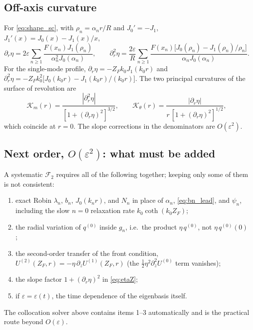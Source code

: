 \documentclass[11pt]{article}
\numberwithin{equation}{section}
\begin{document}
\subsection{Off-axis curvature}
For \eqref{eq:shape_sc}, with $\rho_n=\alpha_nr/R$ and $J_0'=-J_1$, $J_1'(x)=J_0(x)-J_1(x)/x$,
\begin{equation}\partial_r\eta=2\varepsilon\sum_{n\ge1}\frac{F(x_n)J_1(\rho_n)}{\alpha_n^2J_0(\alpha_n)},\qquad
\partial_r^2\eta=\frac{2\varepsilon}{R}\sum_{n\ge1}\frac{F(x_n)\bigl[J_0(\rho_n)-J_1(\rho_n)/\rho_n\bigr]}{\alpha_nJ_0(\alpha_n)}.\end{equation}
For the single-mode profile, $\partial_r\eta=-Z_Fk_0J_1(k_0r)$ and $\partial_r^2\eta=-Z_Fk_0^2\bigl[J_0(k_0r)-J_1(k_0r)/(k_0r)\bigr]$. The two principal curvatures of the surface of revolution are
\begin{equation}\mathcal K_m(r)=\frac{|\partial_r^2\eta|}{[1+(\partial_r\eta)^2]^{3/2}},\qquad
\mathcal K_\theta(r)=\frac{|\partial_r\eta|}{r\,[1+(\partial_r\eta)^2]^{1/2}},\end{equation}
which coincide at $r=0$. The slope corrections in the denominators are $O(\varepsilon^2)$.

\subsection{\texorpdfstring{Next order, $O(\varepsilon^2)$: what must be added}{Next order, O(epsilon squared): what must be added}}
A systematic $\mathcal F_2$ requires all of the following together; keeping only some of them is not consistent:
\begin{enumerate}
\item exact Robin $\lambda_n$, $b_n$, $J_0(k_nr)$, and $N_n$ in place of $\alpha_n$, \eqref{eq:bn_lead}, and $\psi_n$, including the slow $n=0$ relaxation rate $k_0\coth(k_0Z_F)$;
\item the radial variation of $q^{(0)}$ inside $g_n$, i.e.\ the product $\eta\,q^{(0)}$, not $\eta\,q^{(0)}(0)$;
\item the second-order transfer of the front condition, $U^{(2)}(Z_F,r)=-\eta\,\partial_zU^{(1)}(Z_F,r)$ (the $\tfrac12\eta^2\partial_z^2U^{(0)}$ term vanishes);
\item the slope factor $1+(\partial_r\eta)^2$ in \eqref{eq:etaZ};
\item if $\varepsilon=\varepsilon(t)$, the time dependence of the eigenbasis itself.
\end{enumerate}
The collocation solver above contains items 1--3 automatically and is the practical route beyond $O(\varepsilon)$.
\end{document}
